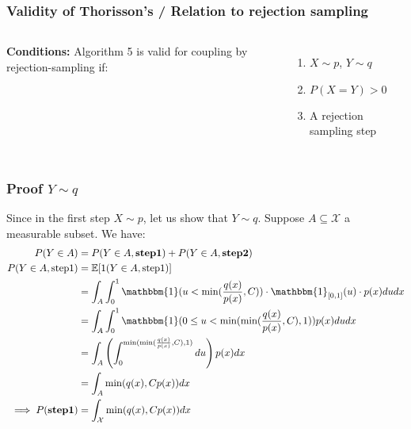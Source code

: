 \documentclass{beamer}
\begin{document}
\begin{frame}
\frametitle{Validity of Thorisson's / Relation to rejection sampling}

\begin{columns}[T, onlytextwidth]

\begin{minipage}[l]{0.35\textwidth}
\textbf{Conditions:}
Algorithm 5 is valid for coupling by rejection-sampling if:
\begin{enumerate}
    \item $X \sim p$, $Y \sim q$
    \item $P(X = Y) > 0$
    \item A rejection sampling step
\end{enumerate}
\end{minipage}


\end{columns}
\end{frame}
\begin{frame}
\frametitle{Proof $Y \sim q$}
Since in the first step $X \sim p$, let us show that $Y \sim q$. Suppose $A\subseteq \mathcal{X}$ a measurable subset. We have:
\begin{align*}
P(Y\in A) &= P(Y\in A, \mathbf{{step1}}) + P(Y\in A, \mathbf{step2}) \\
P(Y\in A, \text{step1}) &= \mathbb{E}[1(Y\in A, \text{step1})] \\
&= \int_{A} \int_{0}^{1} \mathbbm{1}(u < \min (\frac{q(x)}{p(x)}, C)) \cdot \mathbbm{1}_{[0,1]}(u) \cdot p(x) du dx \\
&= \int_{A} \int_{0}^{1} \mathbbm{1}(0 \leq u < \min (\min (\frac{q(x)}{p(x)}, C), 1)) p(x) du dx \\
&= \int_{A} \left( \int_0^{\min(\min(\frac{q(x)}{p(x)}, C),1)} du \right) p(x)dx \\
&= \int_{A} \min(q(x), Cp(x)) dx\\
\implies
P(\mathbf{step1})&= \int_{\mathcal{X}} \min(q(x), Cp(x))dx
\end{align*}
\end{frame}
\end{document}
